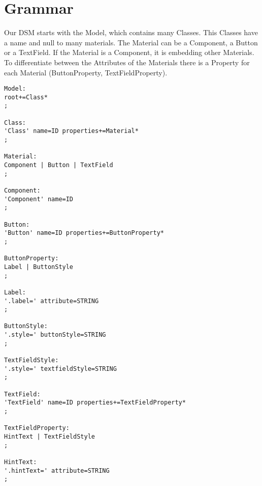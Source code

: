 \chapter{Grammar}
Our DSM starts with the Model, which contains many Classes. This Classes have a name and null to many materials. The Material can be a Component, a Button or a TextField. If the Material is a Component, it is embedding other Materials. To differentiate between the Attributes of the Materials there is a Property for each Material (ButtonProperty, TextFieldProperty).

\begin{lstlisting}
Model:
root+=Class*
;

Class:	
'Class' name=ID properties+=Material*
;

Material:
Component | Button | TextField
;

Component:
'Component' name=ID
;

Button:
'Button' name=ID properties+=ButtonProperty*
;

ButtonProperty:
Label | ButtonStyle
;

Label:
'.label=' attribute=STRING
;

ButtonStyle:
'.style=' buttonStyle=STRING
;

TextFieldStyle:
'.style=' textfieldStyle=STRING
;

TextField:
'TextField' name=ID properties+=TextFieldProperty*
;

TextFieldProperty:
HintText | TextFieldStyle
;

HintText:
'.hintText=' attribute=STRING
;
\end{lstlisting}
